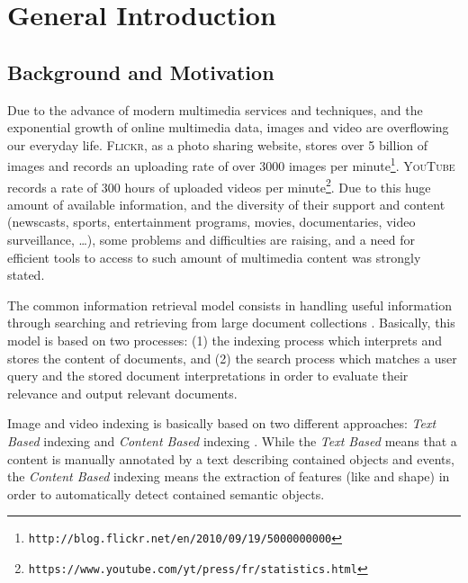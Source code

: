 \chapter{General Introduction}
\label{intro}

	\section{Background and Motivation}

	Due to the advance of modern multimedia services and techniques, and the exponential growth of online 
	multimedia data, images and video are overflowing our everyday life. \textsc{Flickr}, as a photo 
	sharing website, stores over 5 billion of images and records an uploading rate of over 3000 
	images per minute\footnote{\texttt{http://blog.flickr.net/en/2010/09/19/5000000000}}. 
	\textsc{YouTube} records a rate of 300 hours  of uploaded videos per 
	minute\footnote{\texttt{https://www.youtube.com/yt/press/fr/statistics.html}}.
	Due to this huge amount of available information, and the diversity of their support and content 
	(newscasts, sports, entertainment programs, movies, documentaries, video surveillance, \dots{}), 
	some problems and difficulties are raising, and a need for efficient tools to access to 
	such amount of multimedia content was strongly stated. 

	The common information retrieval model consists in handling useful information through 
	searching and retrieving from large document collections \citep{Baeza-Yates1999,Manning2008,Grossman2012}. 
	Basically, this model is based on two processes: (1) the indexing process which interprets 
	and stores the content of documents, and (2) the search process which matches a user 
	query and the stored document interpretations in order to evaluate their relevance and 
	output relevant documents.
	
	Image and video indexing is basically based on two different approaches: \emph{Text Based} 
	indexing \citep{Chang1980} and \emph{Content Based} indexing \citep{Smeaton2008}. While the \emph{Text Based}
	means that a content is manually annotated by a text describing contained objects and events, 
	the \emph{Content Based} indexing means the extraction of features (like  and shape) in order 
	to automatically detect contained semantic objects.


